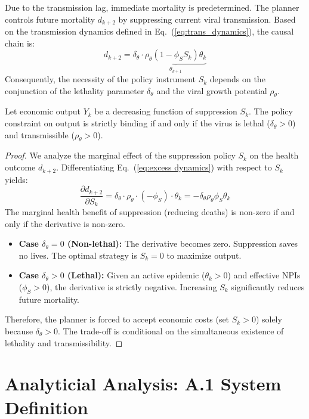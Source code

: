 \documentclass[12pt, a4paper]{article}
\begin{document}
Due to the transmission lag, immediate mortality is predetermined. The planner controls future mortality $d_{k+2}$ by suppressing current viral transmission. Based on the transmission dynamics defined in Eq.~(\ref{eq:trans_dynamics}), the causal chain is:
\begin{equation}
    d_{k+2} = \delta_\theta \cdot \underbrace{\rho_\theta (1 - \phi_S S_k) \theta_k}_{\theta_{k+1}}
    \label{eq:excess dynamics}
\end{equation}
Consequently, the necessity of the policy instrument $S_k$ depends on the conjunction of the lethality parameter $\delta_\theta$ and the viral growth potential $\rho_\theta$.

Let economic output $Y_k$ be a decreasing function of suppression $S_k$. The policy constraint on output is strictly binding if and only if the virus is lethal ($\delta_\theta > 0$) and transmissible ($\rho_\theta > 0$).


\begin{proof}
    We analyze the marginal effect of the suppression policy $S_k$ on the health outcome $d_{k+2}$. Differentiating Eq.~(\ref{eq:excess dynamics}) with respect to $S_k$ yields:
    \begin{equation}
        \frac{\partial d_{k+2}}{\partial S_k} = \delta_\theta \cdot \rho_\theta \cdot (-\phi_S) \cdot \theta_k = - \delta_\theta \rho_\theta \phi_S \theta_k
    \end{equation}
    The marginal health benefit of suppression (reducing deaths) is non-zero if and only if the derivative is non-zero.
    \begin{itemize}
        \item \textbf{Case $\delta_\theta = 0$ (Non-lethal):} The derivative becomes zero. Suppression saves no lives. The optimal strategy is $S_k=0$ to maximize output.
        \item \textbf{Case $\delta_\theta > 0$ (Lethal):} Given an active epidemic ($\theta_k > 0$) and effective NPIs ($\phi_S > 0$), the derivative is strictly negative. Increasing $S_k$ significantly reduces future mortality.
    \end{itemize}
    Therefore, the planner is forced to accept economic costs (set $S_k > 0$) solely because $\delta_\theta > 0$. The trade-off is conditional on the simultaneous existence of lethality and transmissibility.
\end{proof}

\section*{Analyticial Analysis: A.1 System Definition}
\end{document}
